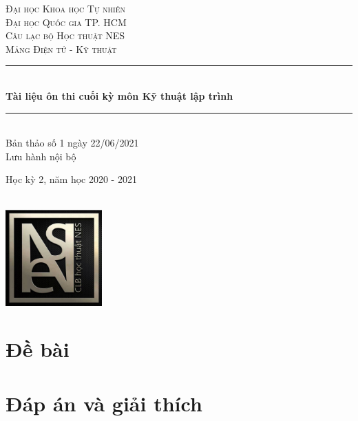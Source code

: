 \documentclass[12pt]{article}
\begin{document}
\begin{titlepage}

\newcommand{\HRule}{\rule{\linewidth}{0.5mm}} %

\center %
\vspace*{\fill}
 
\textsc{\LARGE Đại học Khoa học Tự nhiên}\\[0.2cm]
\textsc{\large Đại học Quốc gia TP. HCM }\\[1.5cm] 
\textsc{\Large Câu lạc bộ Học thuật NES}\\[0.2cm] 
\textsc{\large Mảng Điện tử - Kỹ thuật }\\[0.5cm]
\HRule \\[0.4cm]
{ \huge \bfseries Tài liệu ôn thi cuối kỳ môn\break 
Kỹ thuật lập trình}\\[0.4cm] %
\HRule \\[1.5cm]
\LARGE Bản thảo số 1 ngày 22/06/2021 \\
\LARGE Lưu hành nội bộ
~
\begin{minipage}{1\textwidth}
\begin{center}
    \LARGE Học kỳ 2, năm học 2020 - 2021
\end{center}
\end{minipage}\\[2cm]
\includegraphics[width=10em]{image/neslogo.jpg}
\vspace*{\fill} %
\end{titlepage}
\renewcommand*\contentsname{Mục lục}
\setcounter{tocdepth}{2}
\tableofcontents
\pagebreak

\section{Đề bài}


\section{Đáp án và giải thích}


% 
% 
\end{document}
